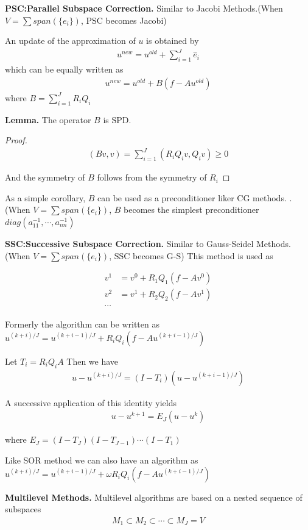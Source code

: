 \documentclass[12pt]{amsart}
\begin{document}
\textbf{PSC:Parallel Subspace Correction.} Similar to Jacobi Methods.(When $V=\sum span(\{e_i\})$, PSC becomes Jacobi)

An update of the approximation of $u$ is obtained by
\begin{align*}
u^{new}=u^{old}+\sum_{i=1}^J \hat e_i
\end{align*}
which can be equally written as 
\begin{align*}
u^{new}=u^{old}+B(f-Au^{old})
\end{align*}
where $B=\sum_{i=1}^J  R_iQ_i$

\textbf{Lemma.} The operator $B$ is SPD.
\begin{proof}
	\begin{align*}
	(Bv,v)=\sum_{i=1}^J(R_iQ_iv,Q_iv)\ge 0
	\end{align*}
	
	And the symmetry of $B$ follows from the symmetry of $R_i$
\end{proof}

As a simple corollary, $B$ can be used as a preconditioner liker CG methods.  .(When $V=\sum span(\{e_i\})$, $B$ becomes the simplest preconditioner $diag(a_{11}^{-1},\cdots,a_{nn}^{-1})$

\textbf{SSC:Successive Subspace Correction.} Similar to Gauss-Seidel Methods.(When $V=\sum span(\{e_i\})$, SSC becomes G-S)
This method is used as

\begin{align*}
v^1&=v^0+R_1Q_1(f-Av^0)\\
v^2&=v^1+R_2Q_2(f-Av^1)\\
\cdots
\end{align*}

Formerly the algorithm can be written as $u^{(k+i)/J}=u^{(k+i-1)/J}+R_iQ_i(f-Au^{(k+i-1)/J})$

Let $T_i=R_iQ_iA$ Then we have
\begin{align*}
u-u^{(k+i)/J}=(I-T_i)(u-u^{(k+i-1)/J})
\end{align*}

A successive application of this identity yields
\begin{align*}
u-u^{k+1}=E_J(u-u^k)
\end{align*}

where $E_J=(I-T_J)(I-T_{J-1})\cdots(I-T_1)$

Like SOR method we can also have an algorithm as$u^{(k+i)/J}=u^{(k+i-1)/J}+\omega R_iQ_i(f-Au^{(k+i-1)/J})$


\textbf{Multilevel Methods.} Multilevel algorithms are based on a nested sequence of subspaces
\begin{align*}
M_1\subset M_2\subset\cdots\subset M_J=V
\end{align*}
\end{document}
